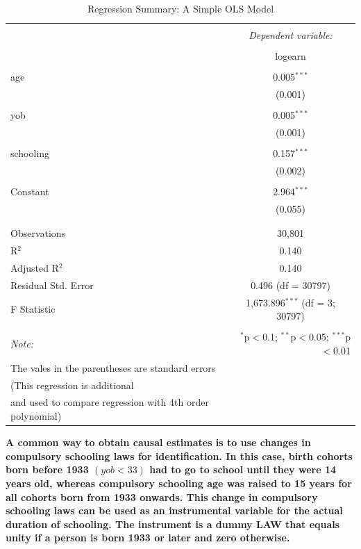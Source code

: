 \documentclass[a4paper,12pt,oneside,English]{article}
\begin{document}
\begin{table}[!htbp] \centering 
  \caption{Regression Summary: A Simple OLS Model} 
  \label{reg 2} 
\begin{tabular}{@{\extracolsep{5pt}}lc} 
\\[-1.8ex]\hline 
\hline \\[-1.8ex] 
 & \multicolumn{1}{c}{\textit{Dependent variable:}} \\ 
\cline{2-2} 
\\[-1.8ex] & logearn \\ 
\hline \\[-1.8ex] 
 age & 0.005$^{***}$ \\ 
  & (0.001) \\ 
  & \\ 
 yob & 0.005$^{***}$ \\ 
  & (0.001) \\ 
  & \\ 
 schooling & 0.157$^{***}$ \\ 
  & (0.002) \\ 
  & \\ 
 Constant & 2.964$^{***}$ \\ 
  & (0.055) \\ 
  & \\ 
\hline \\[-1.8ex] 
Observations & 30,801 \\ 
R$^{2}$ & 0.140 \\ 
Adjusted R$^{2}$ & 0.140 \\ 
Residual Std. Error & 0.496 (df = 30797) \\ 
F Statistic & 1,673.896$^{***}$ (df = 3; 30797) \\ 
\hline 
\hline \\[-1.8ex] 
\textit{Note:}  & \multicolumn{1}{r}{$^{*}$p$<$0.1; $^{**}$p$<$0.05; $^{***}$p$<$0.01} \\ The vales in the parentheses are standard errors\\(This regression is additional \\and used to compare regression with 4th order polynomial)
\end{tabular} 
\end{table} 

\textbf{A common way to obtain causal estimates is to use changes in compulsory schooling laws for identification. In this case, birth cohorts born before 1933 $(yob<33)$ had to go to school until they were 14 years old, whereas compulsory schooling age was raised to 15 years for all cohorts born from 1933 onwards. This change in compulsory schooling laws can be used as an instrumental variable for the actual duration of schooling. The instrument is a dummy LAW that equals unity if a person is born 1933 or later and zero otherwise.} \\
\end{document}
